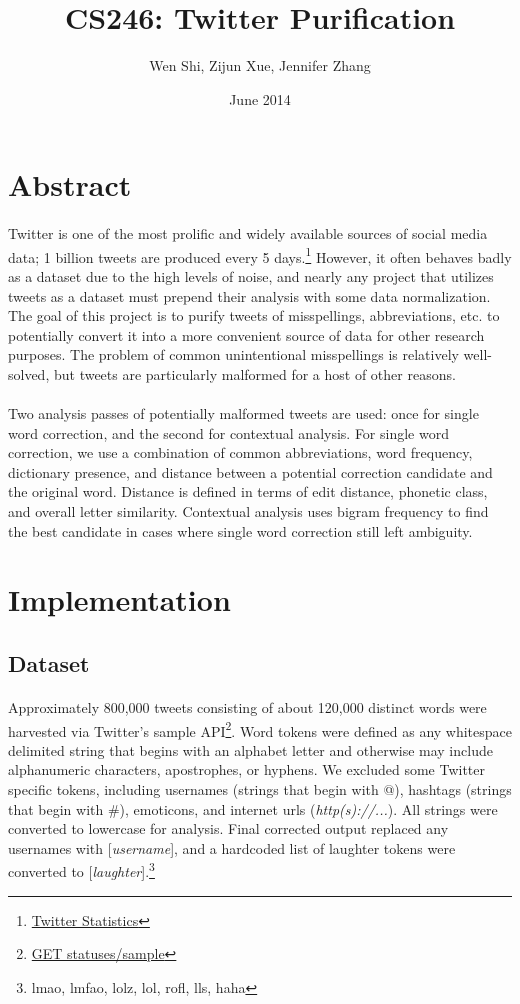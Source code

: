 \documentclass[twocolumn,10pt]{article}
\title{CS246: Twitter Purification}
\author{Wen Shi, Zijun Xue, Jennifer Zhang}
\date{June 2014}
\begin{document}
\maketitle


\section*{Abstract}
\paragraph{} Twitter is one of the most prolific and widely available sources of social media data; 1 billion tweets are produced every 5 days.\footnote{\href{http://http://www.statisticbrain.com/twitter-statistics/}{Twitter Statistics}} However, it often behaves badly as a dataset due to the high levels of noise, and nearly any project that utilizes tweets as a dataset must prepend their analysis with some data normalization. The goal of this project is to purify tweets of misspellings, abbreviations, etc. to potentially convert it into a more convenient source of data for other research purposes. The problem of common unintentional misspellings is relatively well-solved, but tweets are particularly malformed for a host of other reasons.
\paragraph{} Two analysis passes of potentially malformed tweets are used: once for single word correction, and the second for contextual analysis. For single word correction, we use a combination of common abbreviations, word frequency, dictionary presence, and distance between a potential correction candidate and the original word. Distance is defined in terms of edit distance, phonetic class, and overall letter similarity. Contextual analysis uses bigram frequency to find the best candidate in cases where single word correction still left ambiguity.
\section*{Implementation}
\subsection*{Dataset}
\paragraph{} Approximately 800,000 tweets consisting of about 120,000 distinct words were harvested via Twitter's sample API\footnote{\href{https://dev.twitter.com/docs/api/1.1/get/statuses/sample}{GET statuses/sample}}. Word tokens were defined as any whitespace delimited string that begins with an alphabet letter and otherwise may include alphanumeric characters, apostrophes, or hyphens. We excluded some Twitter specific tokens, including usernames (strings that begin with @), hashtags (strings that begin with \#), emoticons, and internet urls (\textit{http(s)://...}). All strings were converted to lowercase for analysis. Final corrected output replaced any usernames with [\textit{username}], and a hardcoded list of laughter tokens were converted to [\textit{laughter}].\footnote{lmao, lmfao, lolz, lol, rofl, lls, haha}
\end{document}
